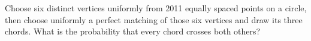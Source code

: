 Choose six distinct vertices uniformly from 2011 equally spaced points on a circle, then choose uniformly a perfect matching of those six vertices and draw its three chords. What is the probability that every chord crosses both others?

